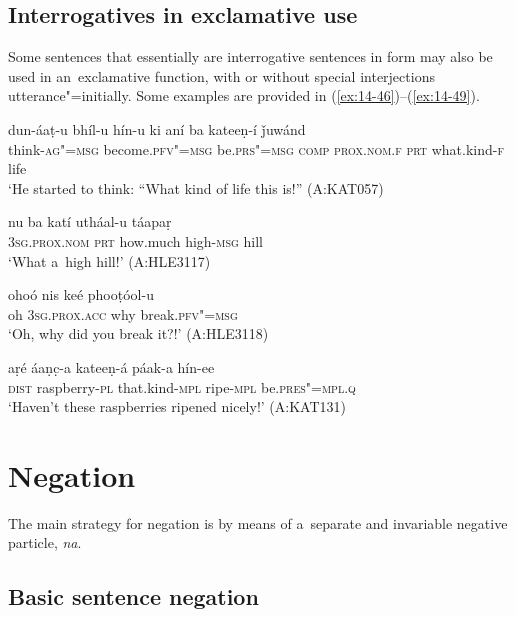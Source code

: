 \subsection{Interrogatives in exclamative use}
\label{subsec:14-2-4}

Some sentences that essentially are interrogative sentences in form may also be used in an~exclamative function, with or without special interjections utterance"=initially. Some examples are provided in (\ref{ex:14-46})--(\ref{ex:14-49}). 

\begin{exe}
\ex
\label{ex:14-46}
\gll dun-áaṭ-u bhíl-u hín-u ki  aní ba kateeṇ-í ǰuwánd \\
think-\textsc{ag"=msg} become.\textsc{pfv"=msg} be.\textsc{prs"=msg} \textsc{comp}  \textsc{prox.nom.f} \textsc{prt} what.kind-\textsc{f} life  \\
\glt `He started to think: ``What kind of life this is!'' (A:KAT057)

\ex
\label{ex:14-47}
\gll nu ba katí utháal-u táapaṛ \\
\textsc{3sg.prox.nom} \textsc{prt} how.much high-\textsc{msg} hill  \\
\glt `What a~high hill!' (A:HLE3117)

\ex
\label{ex:14-48}
\gll ohoó nis keé phooṭóol-u \\
oh \textsc{3sg.prox.acc} why break.\textsc{pfv"=msg} \\
\glt `Oh, why did you break it?!' (A:HLE3118)

\ex
\label{ex:14-49}
\gll aṛé áaṇc̣-a kateeṇ-á páak-a hín-ee \\
\textsc{dist} raspberry-\textsc{pl} that.kind-\textsc{mpl} ripe-\textsc{mpl} be.\textsc{pres"=mpl.q} \\
\glt `Haven't these raspberries ripened nicely!' (A:KAT131)
\end{exe}

\section{Negation}
\label{sec:14-3}


The main strategy for negation is by means of a~separate and invariable negative particle, \textit{na}. 


\subsection{Basic sentence negation}
\label{subsec:14-3-1}



